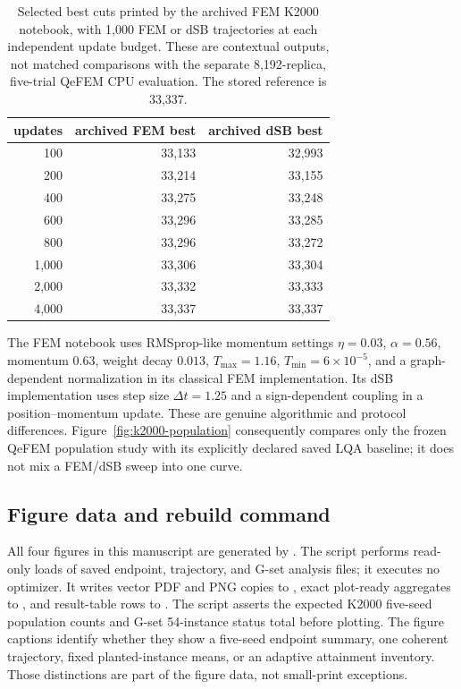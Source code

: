 \begin{table}[ht]
\centering\small
\caption{Selected best cuts printed by the archived FEM K2000 notebook,
with 1,000 FEM or dSB trajectories at each independent update budget.
These are contextual outputs, not matched comparisons with the separate
8,192-replica, five-trial QeFEM CPU evaluation. The stored reference is
33,337.}
\label{tab:archived-context}
\begin{tabular*}{\textwidth}{@{\extracolsep{\fill}}rrr}
\toprule
updates & archived FEM best & archived dSB best\\
\midrule
100 & 33,133 & 32,993\\
200 & 33,214 & 33,155\\
400 & 33,275 & 33,248\\
600 & 33,296 & 33,285\\
800 & 33,296 & 33,272\\
1,000 & 33,306 & 33,304\\
2,000 & 33,332 & 33,333\\
4,000 & 33,337 & 33,337\\
\bottomrule
\end{tabular*}
\end{table}

The FEM notebook uses RMSprop-like momentum settings
$\eta=0.03$, $\alpha=0.56$, momentum $0.63$, weight decay $0.013$,
$T_{\max}=1.16$, $T_{\min}=6\times10^{-5}$, and a graph-dependent
normalization in its classical FEM implementation. Its dSB implementation
uses step size $\Delta t=1.25$ and a sign-dependent coupling in a
position--momentum update. These are genuine algorithmic and protocol
differences. Figure~\ref{fig:k2000-population} consequently compares
only the frozen QeFEM population study with its explicitly declared
saved LQA baseline; it does not mix a FEM/dSB sweep into one curve.

\subsection{Figure data and rebuild command}

All four figures in this manuscript are generated by
. The script performs read-only loads of
saved endpoint, trajectory, and G-set analysis files; it executes no
optimizer. It writes vector PDF and PNG copies to
, exact plot-ready aggregates to
, and result-table rows to
. The script asserts the expected K2000 five-seed
population counts and G-set 54-instance status total before plotting.
The figure captions identify whether they show a five-seed endpoint
summary, one coherent trajectory, fixed planted-instance means, or an
adaptive attainment inventory. Those distinctions are part of the
figure data, not small-print exceptions.
